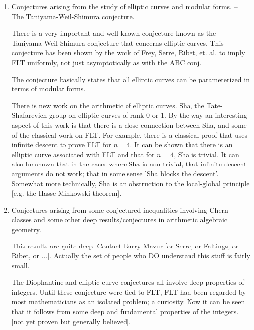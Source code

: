 {\begin{enumerate}
    The ABC conjecture also implies Szpiro's conjecture [and vice-versa]
    and Hall's conjecture. These results are all generally believed to
    be true.

    There is a generalization of the ABC conjecture [by Vojta] which is
    too technical to discuss but involves heights of points on
    non-singular algebraic varieties . Vojta's conjecture also implies
    Mordell's theorem [already known to be true]. There are also a
   number of inter-twined conjectures involving heights on elliptic
    curves that are related to much of this stuff. For a more complete
    discussion, see Lang's article.

    \item Conjectures arising from the study of elliptic curves and
    modular forms. -- The Taniyama-Weil-Shimura conjecture.

    There is a very important and well known conjecture known as the
    Taniyama-Weil-Shimura conjecture that concerns elliptic curves.
    This conjecture has been shown by the work of Frey, Serre, Ribet,
    et. al. to imply FLT uniformly, not just asymptotically as with the
    ABC conj.

    The conjecture basically states that all elliptic curves can be
    parameterized in terms of modular forms.

    There is new work on the arithmetic of elliptic curves. Sha, the
    Tate-Shafarevich group on elliptic curves of rank 0 or 1. By the way
    an interesting aspect of this work is that there is a close
    connection between Sha, and some of the classical work on FLT. For
    example, there is a classical proof that uses infinite descent to
    prove FLT for $n = 4$. It can be shown that there is an elliptic curve
    associated with FLT and that for $n=4$, Sha is trivial. It can also be
    shown that in the cases where Sha is non-trivial, that
    infinite-descent arguments do not work; that in some sense 'Sha
    blocks the descent'. Somewhat more technically, Sha is an
    obstruction to the local-global principle [e.g. the Hasse-Minkowski
    theorem].



    \item Conjectures arising from some conjectured inequalities involving
    Chern classes and some other deep results/conjectures in arithmetic
    algebraic geometry.

    This results are quite deep. Contact
    Barry Mazur [or Serre, or Faltings, or Ribet, or ...]. Actually the
    set of people who DO understand this stuff is fairly small.

    The Diophantine and elliptic curve conjectures all involve deep
    properties of integers. Until these conjecture were tied to FLT,
    FLT had been regarded by most mathematicians as an isolated problem;
    a curiosity. Now it can be seen that it follows from some deep and
    fundamental properties of the integers. [not yet proven but
    generally believed].

\end{enumerate}
}

